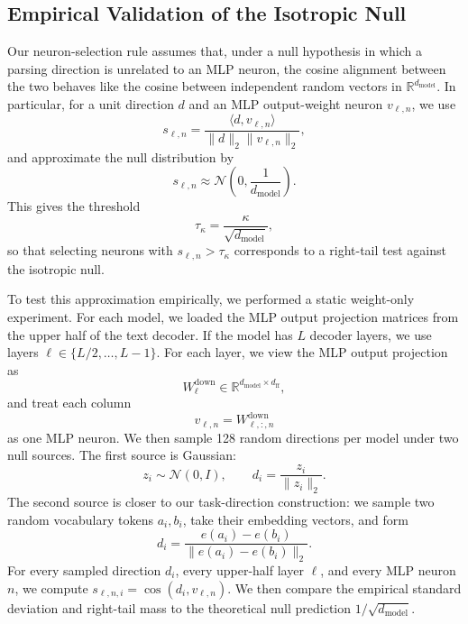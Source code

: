 \subsection{Empirical Validation of the Isotropic Null}
\label{app:null-cosine-validation}

Our neuron-selection rule assumes that, under a null hypothesis in which a
parsing direction is unrelated to an MLP neuron, the cosine alignment between
the two behaves like the cosine between independent random vectors in
\(\mathbb{R}^{d_{\mathrm{model}}}\). In particular, for a unit direction \(d\)
and an MLP output-weight neuron \(v_{\ell,n}\), we use
\[
    s_{\ell,n}
    =
    \frac{\langle d, v_{\ell,n}\rangle}
    {\|d\|_2\|v_{\ell,n}\|_2},
\]
and approximate the null distribution by
\[
    s_{\ell,n}
    \approx
    \mathcal{N}\!\left(0,\frac{1}{d_{\mathrm{model}}}\right).
\]
This gives the threshold
\[
    \tau_\kappa = \frac{\kappa}{\sqrt{d_{\mathrm{model}}}},
\]
so that selecting neurons with \(s_{\ell,n}>\tau_\kappa\) corresponds to a
right-tail test against the isotropic null.

To test this approximation empirically, we performed a static weight-only
experiment. For each model, we loaded the MLP output projection matrices from
the upper half of the text decoder. If the model has \(L\) decoder layers, we
use layers \(\ell\in\{L/2,\ldots,L-1\}\). For each layer, we view the MLP
output projection as
\[
    W^{\mathrm{down}}_\ell
    \in
    \mathbb{R}^{d_{\mathrm{model}}\times d_{\mathrm{ff}}},
\]
and treat each column
\[
    v_{\ell,n}=W^{\mathrm{down}}_{\ell,:,n}
\]
as one MLP neuron. We then sample 128 random directions per model under two
null sources. The first source is Gaussian:
\[
    z_i\sim\mathcal{N}(0,I),
    \qquad
    d_i=\frac{z_i}{\|z_i\|_2}.
\]
The second source is closer to our task-direction construction: we sample two
random vocabulary tokens \(a_i,b_i\), take their embedding vectors, and form
\[
    d_i
    =
    \frac{e(a_i)-e(b_i)}
    {\|e(a_i)-e(b_i)\|_2}.
\]
For every sampled direction \(d_i\), every upper-half layer \(\ell\), and every
MLP neuron \(n\), we compute \(s_{\ell,n,i}=\cos(d_i,v_{\ell,n})\). We then
compare the empirical standard deviation and right-tail mass to the theoretical
null prediction \(1/\sqrt{d_{\mathrm{model}}}\).

